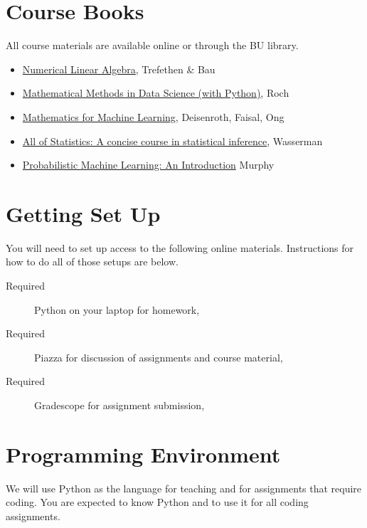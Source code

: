 \documentclass[11pt]{article}
\begin{document}
\section*{Course Books}
All course materials are available online or through the BU library.
\begin{itemize}
\item \href{https://www.stat.uchicago.edu/~lekheng/courses/309/books/Trefethen-Bau.pdf}{Numerical Linear Algebra}, Trefethen \& Bau 
\item \href{https://mmids-textbook.github.io/index.html}{Mathematical Methods in Data Science (with Python)}, Roch
\item \href{https://mml-book.github.io/book/mml-book.pdf}{Mathematics for Machine Learning}, Deisenroth, Faisal, Ong
\item  \href{library.bu.edu}{All of Statistics: A concise course in statistical inference}, Wasserman
\item \href{https://probml.github.io/pml-book/book1.html}{Probabilistic Machine Learning: An Introduction} Murphy
\end{itemize}

\section*{Getting Set Up}

You will need to set up access to the following online materials.
Instructions for how to do all of those setups are below.   

\begin{description}
\item[Required] Python on your laptop for homework, 
\item[Required] Piazza for discussion of assignments and course material,
\item[Required] Gradescope for assignment submission, 
\end{description}

\section*{Programming Environment}

We will use Python as the language for teaching and for
assignments that require coding. You are expected to know Python and
to use it for all coding assignments.
\end{document}
